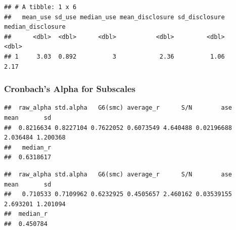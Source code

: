\documentclass[
]{article}
\newenvironment{Shaded}{\begin{snugshade}}{\end{snugshade}}
\newcommand{\CommentTok}[1]{\textcolor[rgb]{0.56,0.35,0.01}{\textit{#1}}}
\newcommand{\FunctionTok}[1]{\textcolor[rgb]{0.13,0.29,0.53}{\textbf{#1}}}
\newcommand{\NormalTok}[1]{#1}
\newcommand{\OtherTok}[1]{\textcolor[rgb]{0.56,0.35,0.01}{#1}}
\newcommand{\SpecialCharTok}[1]{\textcolor[rgb]{0.81,0.36,0.00}{\textbf{#1}}}
\begin{document}
\begin{verbatim}
## # A tibble: 1 x 6
##   mean_use sd_use median_use mean_disclosure sd_disclosure median_disclosure
##      <dbl>  <dbl>      <dbl>           <dbl>         <dbl>             <dbl>
## 1     3.03  0.892          3            2.36          1.06              2.17
\end{verbatim}

\subsubsection{Cronbach's Alpha for
Subscales}\label{cronbachs-alpha-for-subscales}

\begin{Shaded}
\end{Shaded}

\begin{verbatim}
##  raw_alpha std.alpha   G6(smc) average_r      S/N        ase     mean       sd
##  0.8216634 0.8227104 0.7622052 0.6073549 4.640488 0.02196688 2.036484 1.200368
##   median_r
##  0.6318617
\end{verbatim}

\begin{Shaded}
\end{Shaded}

\begin{verbatim}
##  raw_alpha std.alpha   G6(smc) average_r      S/N        ase     mean       sd
##   0.710533 0.7109962 0.6232925 0.4505657 2.460162 0.03539155 2.693201 1.201094
##  median_r
##  0.450784
\end{verbatim}
\end{document}
